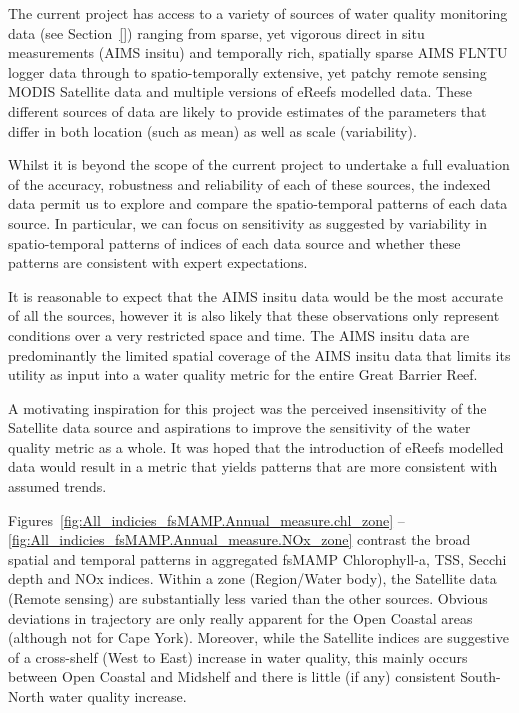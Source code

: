 The current project has access to a variety of sources of water quality monitoring data (see
Section~\ref{}) ranging from sparse, yet vigorous direct in situ measurements (AIMS insitu) and
temporally rich, spatially sparse AIMS FLNTU logger data through to spatio-temporally extensive, yet
patchy remote sensing MODIS Satellite data and multiple versions of eReefs modelled data.  These
different sources of data are likely to provide estimates of the parameters that differ in both
location (such as mean) as well as scale (variability).

Whilst it is beyond the scope of the current project to undertake a full evaluation of the accuracy,
robustness and reliability of each of these sources, the indexed data permit us to explore and
compare the spatio-temporal patterns of each data source.  In particular, we can focus on
sensitivity as suggested by variability in spatio-temporal patterns of indices of each data source
and whether these patterns are consistent with expert expectations.

It is reasonable to expect that the AIMS insitu data would be the most accurate of all the sources,
however it is also likely that these observations only represent conditions over a very restricted
space and time.  The AIMS insitu data are predominantly the limited spatial coverage of the AIMS
insitu data that limits its utility as input into a water quality metric for the entire Great
Barrier Reef.

A motivating inspiration for this project was the perceived insensitivity of the Satellite data
source and aspirations to improve the sensitivity of the water quality metric as a whole.  It was
hoped that the introduction of eReefs modelled data would result in a metric that yields patterns
that are more consistent with assumed trends.

Figures~\ref{fig:All_indicies_fsMAMP.Annual_measure.chl_zone} --
\ref{fig:All_indicies_fsMAMP.Annual_measure.NOx_zone} contrast the broad spatial and temporal
patterns in aggregated fsMAMP Chlorophyll-a, TSS, Secchi depth and NOx indices.  Within a zone
(Region/Water body), the Satellite data (Remote sensing) are substantially less varied than the
other sources.  Obvious deviations in trajectory are only really apparent for the Open Coastal areas
(although not for Cape York).  Moreover, while the Satellite indices are suggestive of a cross-shelf
(West to East) increase in water quality, this mainly occurs between Open Coastal and Midshelf and
there is little (if any) consistent South-North water quality increase.

